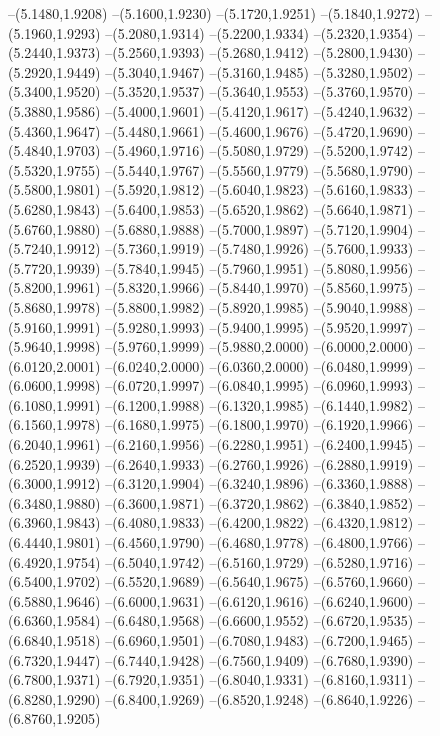 {\begin{scope}
--(5.1480,1.9208)
--(5.1600,1.9230)
--(5.1720,1.9251)
--(5.1840,1.9272)
--(5.1960,1.9293)
--(5.2080,1.9314)
--(5.2200,1.9334)
--(5.2320,1.9354)
--(5.2440,1.9373)
--(5.2560,1.9393)
--(5.2680,1.9412)
--(5.2800,1.9430)
--(5.2920,1.9449)
--(5.3040,1.9467)
--(5.3160,1.9485)
--(5.3280,1.9502)
--(5.3400,1.9520)
--(5.3520,1.9537)
--(5.3640,1.9553)
--(5.3760,1.9570)
--(5.3880,1.9586)
--(5.4000,1.9601)
--(5.4120,1.9617)
--(5.4240,1.9632)
--(5.4360,1.9647)
--(5.4480,1.9661)
--(5.4600,1.9676)
--(5.4720,1.9690)
--(5.4840,1.9703)
--(5.4960,1.9716)
--(5.5080,1.9729)
--(5.5200,1.9742)
--(5.5320,1.9755)
--(5.5440,1.9767)
--(5.5560,1.9779)
--(5.5680,1.9790)
--(5.5800,1.9801)
--(5.5920,1.9812)
--(5.6040,1.9823)
--(5.6160,1.9833)
--(5.6280,1.9843)
--(5.6400,1.9853)
--(5.6520,1.9862)
--(5.6640,1.9871)
--(5.6760,1.9880)
--(5.6880,1.9888)
--(5.7000,1.9897)
--(5.7120,1.9904)
--(5.7240,1.9912)
--(5.7360,1.9919)
--(5.7480,1.9926)
--(5.7600,1.9933)
--(5.7720,1.9939)
--(5.7840,1.9945)
--(5.7960,1.9951)
--(5.8080,1.9956)
--(5.8200,1.9961)
--(5.8320,1.9966)
--(5.8440,1.9970)
--(5.8560,1.9975)
--(5.8680,1.9978)
--(5.8800,1.9982)
--(5.8920,1.9985)
--(5.9040,1.9988)
--(5.9160,1.9991)
--(5.9280,1.9993)
--(5.9400,1.9995)
--(5.9520,1.9997)
--(5.9640,1.9998)
--(5.9760,1.9999)
--(5.9880,2.0000)
--(6.0000,2.0000)
--(6.0120,2.0001)
--(6.0240,2.0000)
--(6.0360,2.0000)
--(6.0480,1.9999)
--(6.0600,1.9998)
--(6.0720,1.9997)
--(6.0840,1.9995)
--(6.0960,1.9993)
--(6.1080,1.9991)
--(6.1200,1.9988)
--(6.1320,1.9985)
--(6.1440,1.9982)
--(6.1560,1.9978)
--(6.1680,1.9975)
--(6.1800,1.9970)
--(6.1920,1.9966)
--(6.2040,1.9961)
--(6.2160,1.9956)
--(6.2280,1.9951)
--(6.2400,1.9945)
--(6.2520,1.9939)
--(6.2640,1.9933)
--(6.2760,1.9926)
--(6.2880,1.9919)
--(6.3000,1.9912)
--(6.3120,1.9904)
--(6.3240,1.9896)
--(6.3360,1.9888)
--(6.3480,1.9880)
--(6.3600,1.9871)
--(6.3720,1.9862)
--(6.3840,1.9852)
--(6.3960,1.9843)
--(6.4080,1.9833)
--(6.4200,1.9822)
--(6.4320,1.9812)
--(6.4440,1.9801)
--(6.4560,1.9790)
--(6.4680,1.9778)
--(6.4800,1.9766)
--(6.4920,1.9754)
--(6.5040,1.9742)
--(6.5160,1.9729)
--(6.5280,1.9716)
--(6.5400,1.9702)
--(6.5520,1.9689)
--(6.5640,1.9675)
--(6.5760,1.9660)
--(6.5880,1.9646)
--(6.6000,1.9631)
--(6.6120,1.9616)
--(6.6240,1.9600)
--(6.6360,1.9584)
--(6.6480,1.9568)
--(6.6600,1.9552)
--(6.6720,1.9535)
--(6.6840,1.9518)
--(6.6960,1.9501)
--(6.7080,1.9483)
--(6.7200,1.9465)
--(6.7320,1.9447)
--(6.7440,1.9428)
--(6.7560,1.9409)
--(6.7680,1.9390)
--(6.7800,1.9371)
--(6.7920,1.9351)
--(6.8040,1.9331)
--(6.8160,1.9311)
--(6.8280,1.9290)
--(6.8400,1.9269)
--(6.8520,1.9248)
--(6.8640,1.9226)
--(6.8760,1.9205)

\end{scope}}
